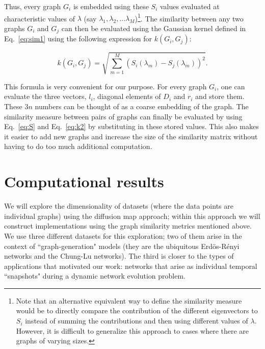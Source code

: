 Thus, every graph $G_i$ is embedded using these $S_i$ values evaluated
at characteristic values of $\lambda$ (say
$\lambda_1, \lambda_2,... \lambda_M$)\footnote{Note that an
  alternative equivalent way to define the similarity measure would be
  to directly compare the contribution of the different eigenvectors
  to $S_i$ instead of summing the contributions and then using
  different values of $\lambda$.  However, it is difficult to
  generalize this approach to cases where there are graphs of varying
  sizes.}.
% 
The similarity between any two graphs $G_i$ and $G_j$ can then be
evaluated using the Gaussian kernel defined in Eq.~\ref{eq:sim1} using
the following expression for $k(G_i,G_j)$:

\begin{equation}
  k(G_i,G_j) = \sqrt{\sum_{m=1}^{M} (S_i(\lambda_m)-S_j(\lambda_m))^2}.
  \label{eq:k2}
\end{equation}

This formula is very convenient for our purpose.
% 
For every graph $G_i$, one can evaluate the three vectors, $l_i$,
diagonal elements of $D_i$ and $r_i$ and store them.
% 
These $3n$ numbers can be thought of as a coarse embedding of the
graph.
% 
The similarity measure between pairs of graphs can finally be
evaluated by using Eq.~\ref{eq:S} and Eq.~\ref{eq:k2} by substituting
in these stored values.
% 
This also makes it easier to add new graphs and increase the size of
the similarity matrix without having to do too much additional
computation.
% 

\section{\label{sec:res} Computational results}


We will explore the dimensionality of datasets (where the data points
are individual graphs) using the diffusion map approach; within this
approach we will construct implementations using the graph similarity
metrics mentioned above.
% 
We use three different datasets for this exploration; two of them
arise in the context of ``graph-generation" models (they are the
ubiquitous Erd\"{o}s-R\'{e}nyi networks and the Chung-Lu networks).
% 
The third is closer to the types of applications that motivated our
work: networks that arise as individual temporal ``snapshots" during a
dynamic network evolution problem.
% 
% 

